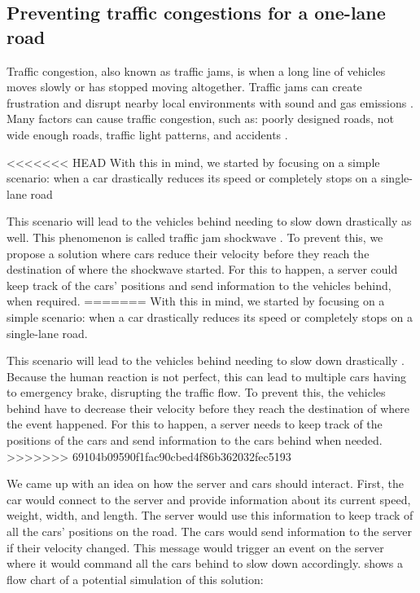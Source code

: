 \subsection{Preventing traffic congestions for a one-lane road}

Traffic congestion, also known as traffic jams, is when a long line of vehicles moves slowly or has stopped moving altogether. Traffic jams can create frustration and disrupt nearby local environments with sound and gas emissions \parencite{traffic_congestion_pollution}. Many factors can cause traffic congestion, such as:
poorly designed roads, not wide enough roads, traffic light patterns, and accidents \parencite{traffic_congestion}.

<<<<<<< HEAD
With this in mind, we started by focusing on a simple scenario: when a car drastically reduces its speed or completely stops on a single-lane road 

This scenario will lead to the vehicles behind needing to slow down drastically as well. This phenomenon is called traffic jam shockwave \parencite{traffic_shockwave}. To prevent this, we propose a solution where cars reduce their velocity before they reach the destination of where the shockwave started. For this to happen, a server could keep track of the cars' positions and send information to the vehicles behind, when required. 
=======
With this in mind, we started by focusing on a simple scenario: when a car drastically reduces its speed or completely stops on a single-lane road.

This scenario will lead to the vehicles behind needing to slow down drastically \parencite{traffic_shockwave}. Because the human reaction is not perfect, this can lead to multiple cars having to emergency brake, disrupting the traffic flow. To prevent this, the vehicles behind have to decrease their velocity before they reach the destination of where the event happened. For this to happen, a server needs to keep track of the positions of the cars and send information to the cars behind when needed. 
>>>>>>> 69104b09590f1fac90cbed4f86b362032fec5193

We came up with an idea on how the server and cars should interact. First, the car would connect to the server and provide information about its current speed, weight, width, and length. The server would use this information to keep track of all the cars' positions on the road. The cars would send information to the server if their velocity changed. This message would trigger an event on the server where it would command all the cars behind to slow down accordingly.  shows a flow chart of a potential simulation of this solution:

